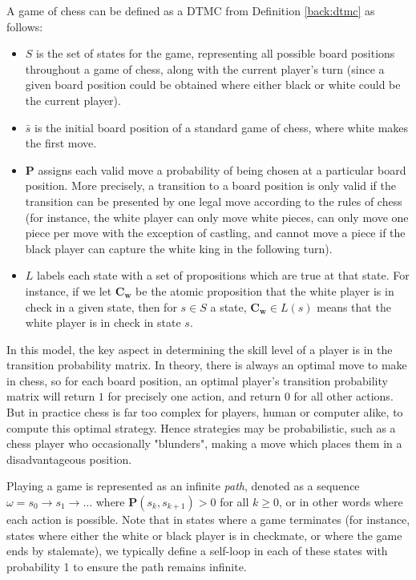 \begin{example}
\label{back:chess}

    A game of chess can be defined as a DTMC from Definition \ref{back:dtmc} as follows:

    \begin{itemize}
        \item $S$ is the set of states for the game, representing all possible board positions throughout a game of chess, along with the current player's turn (since a given board position could be obtained where either black or white could be the current player).
        \item $\bar{s}$ is the initial board position of a standard game of chess, where white makes the first move.
        \item $\mathbf{P}$ assigns each valid move a probability of being chosen at a particular board position. More precisely, a transition to a board position is only valid if the transition can be presented by one legal move according to the rules of chess (for instance, the white player can only move white pieces, can only move one piece per move with the exception of castling, and cannot move a piece if the black player can capture the white king in the following turn).
        \item $L$ labels each state with a set of propositions which are true at that state. For instance, if we let $\mathbf{C_w}$ be the atomic proposition that the white player is in check in a given state, then for $s \in S$ a state, $\mathbf{C_w} \in L(s)$ means that the white player is in check in state $s$.
    \end{itemize}

    In this model, the key aspect in determining the skill level of a player is in the transition probability matrix. In theory, there is always an optimal move to make in chess, so for each board position, an optimal player's transition probability matrix will return $1$ for precisely one action, and return $0$ for all other actions. But in practice chess is far too complex for players, human or computer alike, to compute this optimal strategy. Hence strategies may be probabilistic, such as a chess player who occasionally "blunders", making a move which places them in a disadvantageous position.

\end{example}

Playing a game is represented as an infinite \emph{path}, denoted as a sequence $\omega = s_0 \rightarrow s_1 \rightarrow \dots$ where $\mathbf{P}(s_k, s_{k+1})>0$ for all $k\geq0$, or in other words where each action is possible. Note that in states where a game terminates (for instance, states where either the white or black player is in checkmate, or where the game ends by stalemate), we typically define a self-loop in each of these states with probability 1 to ensure the path remains infinite.

